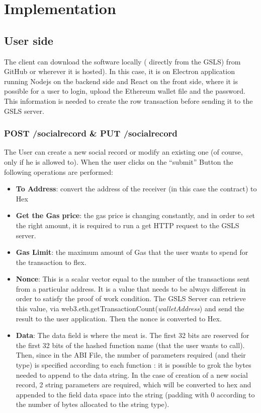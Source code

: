 \chapter{Implementation}
\label{implementation}


\section{User side}

The client can download the software locally ( directly from the GSLS) from GitHub or wherever it is hosted).
In this case, it is on Electron application running Nodejs on the backend side and React on the front side, where it is possible for a user to login, upload the Ethereum wallet file and the password.
This information is needed to create the row transaction before sending it to the GSLS server.


\subsection{POST /socialrecord \& PUT /socialrecord}
The User can create a new social record or modify an existing one (of course, only if he is allowed to).
When the user clicks on the “submit” Button the following operations are performed:

\begin{itemize},
  \item \textbf{To Address}: convert the address of the receiver (in this case the contract) to Hex
  \item \textbf{Get the Gas price}: the gas price is changing constantly, and in order to set the right amount, it is required to run a get HTTP request to the GSLS server.
  \item \textbf{Gas Limit}: the maximum amount of Gas that the user wants to spend for the transaction to flex.
  \item \textbf{Nonce}: This is a scalar vector equal to the number of the transactions sent from a particular address. It is a value that needs to be always different in order to satisfy the proof of work condition.
  The GSLS Server can retrieve this value, via web3.eth.getTransactionCount(\textit{walletAddress}) and send the result to the user application. Then the nonce is converted to Hex.
  \item \textbf{Data}: The data field is where the meat is. The first 32 bits are reserved for the first 32 bits of the hashed function name (that the user wants to call).
  Then, since in the ABI File, the number of parameters required (and their type) is specified  according to each function : it is possible to grok the bytes needed to append to the data string.
  In the case of creation of a new social record, 2 string parameters are required, which will be converted to hex and appended to the field data space into the string (padding with 0 according to the number of bytes allocated to the string type).
\end{itemize}

